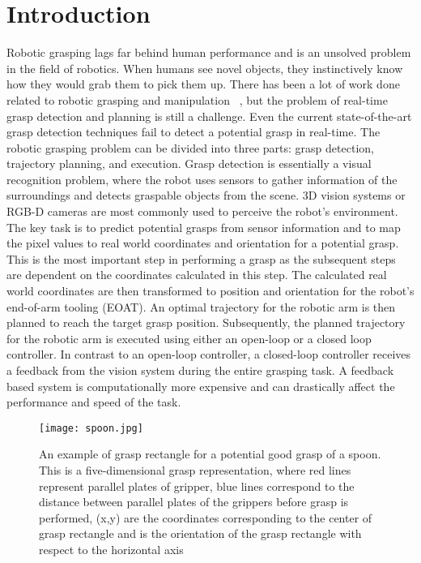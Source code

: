 \documentclass[10pt,twocolumn,letterpaper]{article}
\begin{document}
\section{Introduction}
Robotic grasping lags far behind human performance and is an unsolved problem in the field of robotics. When humans see novel objects, they instinctively know how they would grab them to pick them up. There has been a lot of work done related to robotic grasping and manipulation ~\cite{Ciocarlie2014,Redmon,saxena2008robotic}, but the problem of real-time grasp detection and planning is still a challenge. Even the current state-of-the-art grasp detection techniques fail to detect a potential grasp in real-time. The robotic grasping problem can be divided into three parts: grasp detection, trajectory planning, and execution. Grasp detection is essentially a visual recognition problem, where the robot uses sensors to gather information of the surroundings and detects graspable objects from the scene. 3D vision systems or RGB-D cameras are most commonly used to perceive the robot's environment. The key task is to predict potential grasps from sensor information and to map the pixel values to real world coordinates and orientation for a potential grasp. This is the most important step in performing a grasp as the subsequent steps are dependent on the coordinates calculated in this step. The calculated real world coordinates are then transformed to position and orientation for the robot's end-of-arm tooling (EOAT). An optimal trajectory for the robotic arm is then planned to reach the target grasp position. Subsequently, the planned trajectory for the robotic arm is  executed using either an open-loop or a closed loop controller. In contrast to an open-loop controller, a closed-loop controller receives a feedback from the vision system during the entire grasping task. A feedback based system is computationally more expensive and can drastically affect the performance and speed of the task. 

\begin{figure}
\begin{center}
\texttt{[image: spoon.jpg]}
\end{center}
   \caption{An example of grasp rectangle for a potential good grasp of a spoon. This is a five-dimensional grasp representation, where red lines represent parallel plates of gripper, blue lines correspond to the distance between parallel plates of the grippers before grasp is performed, (x,y) are the coordinates corresponding to the center of grasp rectangle and  is the orientation of the grasp rectangle with respect to the horizontal axis}
\label{fig:rit_mug}
\end{figure}
\end{document}
